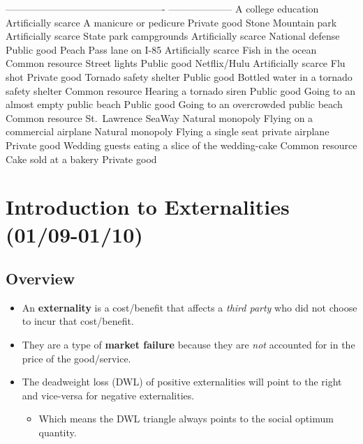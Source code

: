 \documentclass[
  letterpaper,
  DIV=11,
  numbers=noendperiod]{scrartcl}
\providecommand{\tightlist}{%
  \setlength{\itemsep}{0pt}\setlength{\parskip}{0pt}}\usepackage{longtable,booktabs,array}
\begin{document}
------------------------------------------------- \textbar{}
-------------------- A college education \textbar{} Artificially scarce
A manicure or pedicure \textbar{} Private good Stone Mountain park
\textbar{} Artificially scarce State park campgrounds \textbar{}
Artificially scarce National defense \textbar{} Public good Peach Pass
lane on I-85 \textbar{} Artificially scarce Fish in the ocean \textbar{}
Common resource Street lights \textbar{} Public good Netflix/Hulu
\textbar{} Artificially scarce Flu shot \textbar{} Private good Tornado
safety shelter \textbar{} Public good Bottled water in a tornado safety
shelter \textbar{} Common resource Hearing a tornado siren \textbar{}
Public good Going to an almost empty public beach \textbar{} Public good
Going to an overcrowded public beach \textbar{} Common resource
St.~Lawrence SeaWay \textbar{} Natural monopoly Flying on a commercial
airplane \textbar{} Natural monopoly Flying a single seat private
airplane \textbar{} Private good Wedding guests eating a slice of the
wedding-cake \textbar{} Common resource Cake sold at a bakery \textbar{}
Private good

\newpage{}

\section{Introduction to Externalities
(01/09-01/10)}\label{introduction-to-externalities-0109-0110}

\subsection{Overview}\label{overview}

\begin{itemize}
\tightlist
\item
  An \textbf{externality} is a cost/benefit that affects a \emph{third
  party} who did not choose to incur that cost/benefit.
\item
  They are a type of \textbf{market failure} because they are \emph{not}
  accounted for in the price of the good/service.
\item
  The deadweight loss (DWL) of positive externalities will point to the
  right and vice-versa for negative externalities.

  \begin{itemize}
  \tightlist
  \item
    Which means the DWL triangle always points to the social optimum
    quantity.
  \end{itemize}
\end{itemize}
\end{document}
